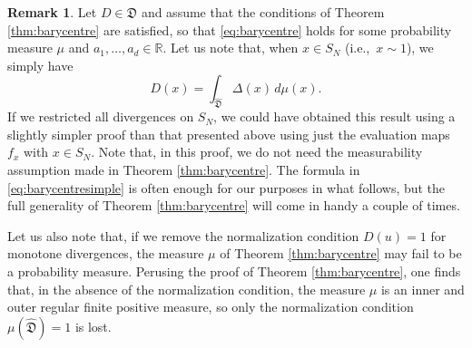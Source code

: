 \documentclass[12pt,a4paper,reqno]{amsart}
\theoremstyle{definition}
\newtheorem{remark}[proposition]{Remark}
\newcommand{\mf}[1]{\mathfrak{#1}}
\newcommand{\R}{\mathbb R}
\begin{document}
\begin{remark}\label{rem:barycentre}
Let $D\in\mf D$ and assume that the conditions of Theorem \ref{thm:barycentre} are satisfied, so that \eqref{eq:barycentre} holds for some probability measure $\mu$ and $a_1,\ldots,a_d\in\R$. Let us note that, when $x\in S_N$ (i.e.,\ $x\sim 1$), we simply have
\begin{equation}\label{eq:barycentresimple}
D(x)=\int_{\hat{\mf D}}\Delta(x)\,d\mu(x).
\end{equation}
If we restricted all divergences on $S_N$, we could have obtained this result using a slightly simpler proof than that presented above using just the evaluation maps $f_x$ with $x\in S_N$. Note that, in this proof, we do not need the measurability assumption made in Theorem \ref{thm:barycentre}. The formula in \eqref{eq:barycentresimple} is often enough for our purposes in what follows, but the full generality of Theorem \ref{thm:barycentre} will come in handy a couple of times.

Let us also note that, if we remove the normalization condition $D(u)=1$ for monotone divergences, the measure $\mu$ of Theorem \ref{thm:barycentre} may fail to be a probability measure. Perusing the proof of Theorem \ref{thm:barycentre}, one finds that, in the absence of the normalization condition, the measure $\mu$ is an inner and outer regular finite positive measure, so only the normalization condition $\mu(\hat{\mf D})=1$ is lost.
\end{remark}
\end{document}
